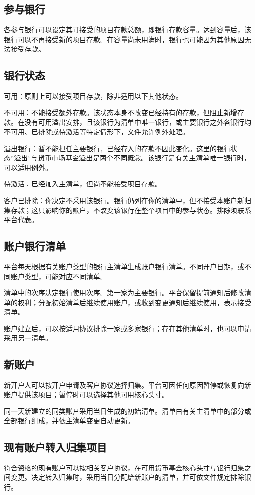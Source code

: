 \documentclass[UTF8,fontset=none,11pt,a4paper]{ctexart}
\begin{document}
\subsection*{参与银行}
各参与银行可以设定其可接受的项目存款总额，即银行存款容量。达到容量后，该银行可以不再接受新的项目存款。在容量尚未用满时，银行也可能因为其他原因无法接受存款。


\subsection*{银行状态}
可用：原则上可以接受项目存款，除非适用以下其他状态。


不可用：不能接受额外存款。该状态本身不改变已经持有的存款，但阻止新增存款。在没有可用溢出安排，且该银行为清单中唯一银行，或主要银行之外各银行均不可用、已排除或待激活等特定情形下，文件允许例外处理。


溢出银行：暂不能担任主要银行，已经存入的存款不因此变化。这里的银行状态“溢出”与货币市场基金溢出是两个不同概念。该银行是有关主清单唯一银行时，可以适用例外。


待激活：已经加入主清单，但尚不能接受项目存款。


客户已排除：你决定不采用该银行。银行仍列在你的清单中，但不接受本账户新归集存款；这只影响你的账户，不改变该银行在整个项目中的参与状态。排除须联系平台代表。


\subsection*{账户银行清单}
平台每天根据有关账户类型的银行主清单生成账户银行清单。不同开户日期，或不同账户类型，可能对应不同清单。


清单中的次序决定银行使用次序。第一家为主要银行。平台保留提前通知后修改清单的权利；分配初始清单后继续使用账户，或收到变更通知后继续使用，表示接受清单。


账户建立后，可以按适用协议排除一家或多家银行；存在其他清单时，也可以申请采用另一清单。


\subsection*{新账户}
新开户人可以按开户申请及客户协议选择归集。平台可因任何原因暂停或恢复向新账户提供该项目；暂停时可以选择其他可用核心头寸。


同一天新建立的同类账户采用当日生成的初始清单。清单由有关主清单中的部分或全部银行组成，并依主清单变更自动更新。


\subsection*{现有账户转入归集项目}
符合资格的现有账户可以按相关客户协议，在可用货币基金核心头寸与银行归集之间变更。决定转入归集时，采用当日分配给新账户的清单，并可依文件规定排除银行。
\end{document}
